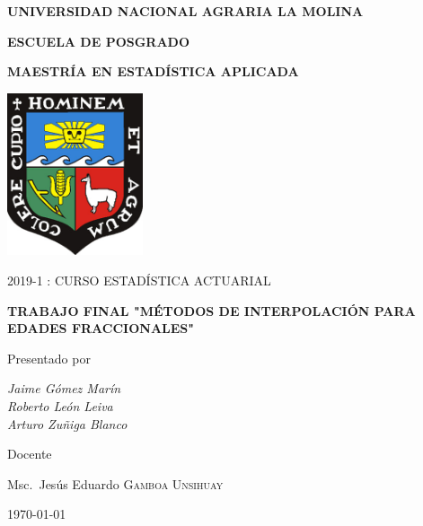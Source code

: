 \begin{titlepage}
	\centering
	{\scshape\LARGE\bfseries UNIVERSIDAD NACIONAL AGRARIA LA MOLINA \par}
	\vspace{0.60cm}	
	{\scshape\large\bfseries ESCUELA DE POSGRADO \par}
	\vspace{0.60cm}	
	{\scshape\large\bfseries MAESTR\'IA EN ESTAD\'ISTICA APLICADA  \par}
	\vspace{0.60cm}	
	
	\includegraphics[width=0.30\textwidth]{img/323x386_ESCUDOCOLOR}\par\vspace{1cm}
	{\scshape\large 2019-1 : CURSO ESTAD\'ISTICA ACTUARIAL\par}
	\vspace{0.60cm}
	{\large\bfseries TRABAJO FINAL "M\'ETODOS DE INTERPOLACI\'ON PARA EDADES FRACCIONALES" \par}
	\vspace{0.60cm}

	\vfill
	Presentado por \par
	{\large\itshape { Jaime G\'omez Mar\'in \\ Roberto Le\'on Leiva \\ Arturo Zu\~niga Blanco}\par}
	\vspace{0.40cm}
	\vfill
	Docente \par
	Msc.~Jes\'us Eduardo \textsc{Gamboa Unsihuay}
	
  \vspace{0.40cm}
	\vfill
	{\large \today\par}
\end{titlepage}